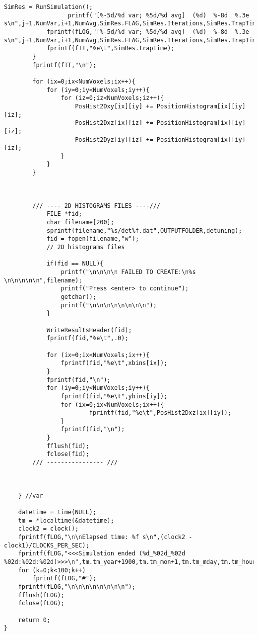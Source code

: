 \begin{lstlisting}[style=CStyle]
            SimRes = RunSimulation();
                  printf("[%-5d/%d var; %5d/%d avg]  (%d)  %-8d  %.3e s\n",j+1,NumVar,i+1,NumAvg,SimRes.FLAG,SimRes.Iterations,SimRes.TrapTime);
            fprintf(fLOG,"[%-5d/%d var; %5d/%d avg]  (%d)  %-8d  %.3e s\n",j+1,NumVar,i+1,NumAvg,SimRes.FLAG,SimRes.Iterations,SimRes.TrapTime);
            fprintf(fTT,"%e\t",SimRes.TrapTime);
        }
        fprintf(fTT,"\n");

        for (ix=0;ix<NumVoxels;ix++){
            for (iy=0;iy<NumVoxels;iy++){
                for (iz=0;iz<NumVoxels;iz++){
                    PosHist2Dxy[ix][iy] += PositionHistogram[ix][iy][iz];
                    PosHist2Dxz[ix][iz] += PositionHistogram[ix][iy][iz];
                    PosHist2Dyz[iy][iz] += PositionHistogram[ix][iy][iz];
                }
            }
        }



        /// ---- 2D HISTOGRAMS FILES ----///
            FILE *fid;
            char filename[200];
            sprintf(filename,"%s/det%f.dat",OUTPUTFOLDER,detuning);
            fid = fopen(filename,"w");
            // 2D histograms files

            if(fid == NULL){
                printf("\n\n\n\n FAILED TO CREATE:\n%s \n\n\n\n\n",filename);
                printf("Press <enter> to continue");
                getchar();
                printf("\n\n\n\n\n\n\n\n");
            }

            WriteResultsHeader(fid);
            fprintf(fid,"%e\t",.0);

            for (ix=0;ix<NumVoxels;ix++){
                fprintf(fid,"%e\t",xbins[ix]);
            }
            fprintf(fid,"\n");
            for (iy=0;iy<NumVoxels;iy++){
                fprintf(fid,"%e\t",ybins[iy]);
                for (ix=0;ix<NumVoxels;ix++){
                        fprintf(fid,"%e\t",PosHist2Dxz[ix][iy]);
                }
                fprintf(fid,"\n");
            }
            fflush(fid);
            fclose(fid);
        /// ---------------- ///



    } //var

    datetime = time(NULL);
    tm = *localtime(&datetime);
    clock2 = clock();
    fprintf(fLOG,"\n\nElapsed time: %f s\n",(clock2 - clock1)/CLOCKS_PER_SEC);
    fprintf(fLOG,"<<<Simulation ended (%d_%02d_%02d %02d:%02d:%02d)>>>\n",tm.tm_year+1900,tm.tm_mon+1,tm.tm_mday,tm.tm_hour,tm.tm_min,tm.tm_sec);
    for (k=0;k<100;k++)
        fprintf(fLOG,"#");
    fprintf(fLOG,"\n\n\n\n\n\n\n\n");
    fflush(fLOG);
    fclose(fLOG);

    return 0;
}
\end{lstlisting}